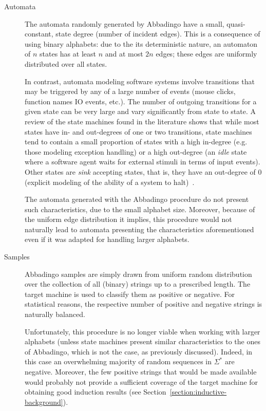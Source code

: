 \begin{description}
\item[Automata] The automata randomly generated by Abbadingo have a small, quasi-constant, state degree (number of incident edges). This is a consequence of using binary alphabets: due to the its deterministic nature, an automaton of $n$ states has at least $n$ and at most $2n$ edges; these edges are uniformly distributed over all states. 

In contrast, automata modeling software systems involve transitions that may be triggered by any of a large number of events (mouse clicks, function names IO events, etc.). The number of outgoing transitions for a given state can be very large and vary significantly from state to state. A review of the state machines found in the literature shows that while most states have in- and out-degrees of one or two transitions, state machines tend to contain a small proportion of states with a high in-degree (e.g. those modeling exception handling) or a high out-degree (an \emph{idle} state where a software agent waits for external stimuli in terms of input events). Other states are \emph{sink} accepting states, that is, they have an out-degree of 0 (explicit modeling of the ability of a system to halt)~\cite{Walkinshaw:2008}.

The automata generated with the Abbadingo procedure do not present such characteristics, due to the small alphabet size. Moreover, because of the uniform edge distribution it implies, this procedure would not naturally lead to automata presenting the characteristics aforementioned even if it was adapted for handling larger alphabets.

\item[Samples] Abbadingo samples are simply drawn from uniform random distribution over the collection of all (binary) strings up to a prescribed length. The target machine is used to classify them as positive or negative. For statistical reasons, the respective number of positive and negative strings is naturally balanced.

Unfortunately, this procedure is no longer viable when working with larger alphabets (unless state machines present similar characteristics to the ones of Abbadingo, which is not the case, as previously discussed). Indeed, in this case an overwhelming majority of random sequences in $\Sigma^*$ are negative. Moreover, the few positive strings that would be made available would probably not provide a sufficient coverage of the target machine for obtaining good induction results (see Section~\ref{section:inductive-background}).


\end{description}
